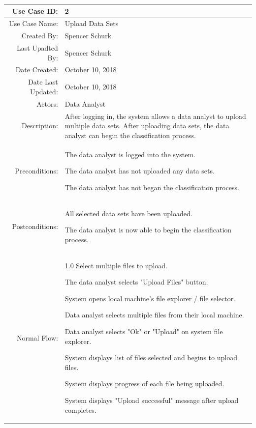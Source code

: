 \documentclass[12pt,oneside,letterpaper]{article}
\newenvironment{packed_enumerate}{ %
\vspace{-7mm}
\begin{enumerate}
  \setlength{\itemsep}{0pt}
  \setlength{\parskip}{0pt}
  \setlength{\parsep}{0pt}
}{\end{enumerate}
\vspace{-8mm}}
\begin{document}
\begin{longtable}{|r|p{3.8in}|}
\hline
Use Case ID:&2\\
\hline
Use Case Name:&Upload Data Sets\\
\hline
Created By:&Spencer Schurk\\
\hline
Last Upadted By:&Spencer Schurk\\
\hline
Date Created:&October 10, 2018\\
\hline
Date Last Updated:&October 10, 2018\\
\hline
Actors:&Data Analyst\\
\hline
Description:&After logging in, the system allows a data analyst to upload multiple data sets. After uploading data sets, the data analyst can begin the classification process.\\
\hline
Preconditions:&\begin{packed_enumerate}
\item The data analyst is logged into the system.
\item The data analyst has not uploaded any data sets.
\item The data analyst has not began the classification process.
\end{packed_enumerate}\\
\hline
Postconditions:&\begin{packed_enumerate}
\item All selected data sets have been uploaded.
\item The data analyst is now able to begin the classification process.
\end{packed_enumerate}\\
\hline
Normal Flow:&1.0 Select multiple files to upload.\newline
\begin{packed_enumerate}
\item The data analyst selects "Upload Files" button.
\item System opens local machine's file explorer / file selector.
\item Data analyst selects multiple files from their local machine.
\item Data analyst selects "Ok" or "Upload" on system file explorer.
\item System displays list of files selected and begins to upload files.
\item System displays progress of each file being uploaded.
\item System displays "Upload successful" message after upload completes.

\end{packed_enumerate}
\end{longtable}
\end{document}
